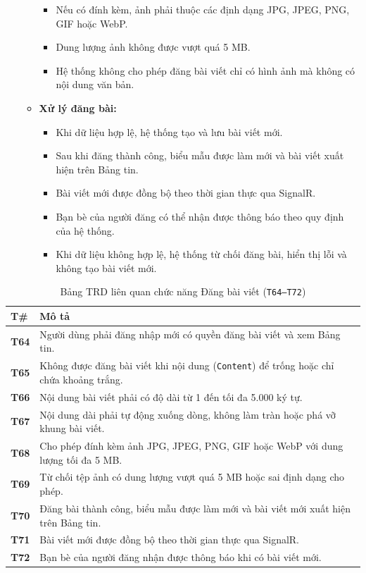 \documentclass[11pt,a4paper]{article}
\begin{document}
\begin{itemize}[leftmargin=1.2cm, noitemsep]
\begin{itemize}[leftmargin=0.8cm, label=$\ast$, noitemsep]
\begin{itemize}[leftmargin=0.6cm, label=$\circ$, noitemsep]
            \item Nếu có đính kèm, ảnh phải thuộc các định dạng JPG, JPEG, PNG, GIF hoặc WebP.
            \item Dung lượng ảnh không được vượt quá 5 MB.
            \item Hệ thống không cho phép đăng bài viết chỉ có hình ảnh mà không có nội dung văn bản.
        \end{itemize}
        \item \textbf{Xử lý đăng bài:}
        \begin{itemize}[leftmargin=0.6cm, label=$\circ$, noitemsep]
            \item Khi dữ liệu hợp lệ, hệ thống tạo và lưu bài viết mới.
            \item Sau khi đăng thành công, biểu mẫu được làm mới và bài viết xuất hiện trên Bảng tin.
            \item Bài viết mới được đồng bộ theo thời gian thực qua SignalR.
            \item Bạn bè của người đăng có thể nhận được thông báo theo quy định của hệ thống.
            \item Khi dữ liệu không hợp lệ, hệ thống từ chối đăng bài, hiển thị lỗi và không tạo bài viết mới.
        \end{itemize}
    \end{itemize}
\end{itemize}

\begin{table}[H]
\centering
\small
\begin{tabularx}{\textwidth}{|C{1.5cm}|X|}
\hline
{}
\textbf{T\#} & \textbf{Mô tả} \tabularnewline
\hline
\textbf{T64} & Người dùng phải đăng nhập mới có quyền đăng bài viết và xem Bảng tin. \\ \hline
\textbf{T65} & Không được đăng bài viết khi nội dung (\texttt{Content}) để trống hoặc chỉ chứa khoảng trắng. \\ \hline
\textbf{T66} & Nội dung bài viết phải có độ dài từ 1 đến tối đa 5.000 ký tự. \\ \hline
\textbf{T67} & Nội dung dài phải tự động xuống dòng, không làm tràn hoặc phá vỡ khung bài viết. \\ \hline
\textbf{T68} & Cho phép đính kèm ảnh JPG, JPEG, PNG, GIF hoặc WebP với dung lượng tối đa 5 MB. \\ \hline
\textbf{T69} & Từ chối tệp ảnh có dung lượng vượt quá 5 MB hoặc sai định dạng cho phép. \\ \hline
\textbf{T70} & Đăng bài thành công, biểu mẫu được làm mới và bài viết mới xuất hiện trên Bảng tin. \\ \hline
\textbf{T71} & Bài viết mới được đồng bộ theo thời gian thực qua SignalR. \\ \hline
\textbf{T72} & Bạn bè của người đăng nhận được thông báo khi có bài viết mới. \\ \hline
\end{tabularx}
\caption{Bảng TRD liên quan chức năng Đăng bài viết (\texttt{T64--T72})}
\end{table}
\end{document}
